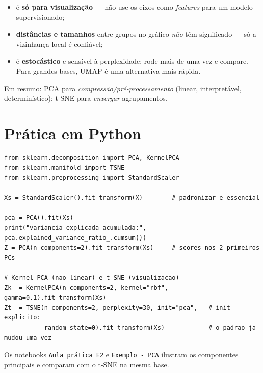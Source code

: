 \documentclass[11pt,a4paper]{article}
\begin{document}
\begin{atencao}
\begin{itemize}[leftmargin=1.2cm,nosep]
  \item é \textbf{só para visualização} --- não use os eixos como \emph{features}
        para um modelo supervisionado;
  \item \textbf{distâncias e tamanhos} entre grupos no gráfico \emph{não} têm
        significado --- só a vizinhança local é confiável;
  \item é \textbf{estocástico} e sensível à perplexidade: rode mais de uma vez e
        compare. Para grandes bases, UMAP é uma alternativa mais rápida.
\end{itemize}
Em resumo: PCA para \emph{compressão/pré-processamento} (linear, interpretável,
determinístico); t-SNE para \emph{enxergar} agrupamentos.
\end{atencao}

\section{Prática em Python}
\begin{lstlisting}
from sklearn.decomposition import PCA, KernelPCA
from sklearn.manifold import TSNE
from sklearn.preprocessing import StandardScaler

Xs = StandardScaler().fit_transform(X)        # padronizar e essencial

pca = PCA().fit(Xs)
print("variancia explicada acumulada:", pca.explained_variance_ratio_.cumsum())
Z = PCA(n_components=2).fit_transform(Xs)     # scores nos 2 primeiros PCs

# Kernel PCA (nao linear) e t-SNE (visualizacao)
Zk  = KernelPCA(n_components=2, kernel="rbf", gamma=0.1).fit_transform(Xs)
Zt  = TSNE(n_components=2, perplexity=30, init="pca",   # init explicito:
           random_state=0).fit_transform(Xs)            # o padrao ja mudou uma vez
\end{lstlisting}
Os notebooks \texttt{Aula prática E2} e \texttt{Exemplo - PCA} ilustram os
componentes principais e comparam com o
t-SNE na mesma base.

\end{document}
